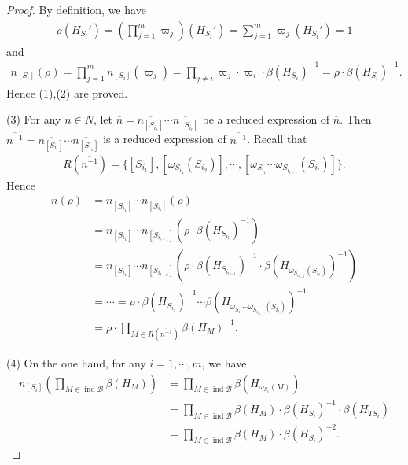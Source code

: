 \documentclass[12pt]{amsart}
\begin{document}
\begin{proof}
    By definition, we have
    \begin{align*}
         \rho(H_{S_i}') = (\prod_{j=1}^m \varpi_j)(H_{S_i}') = \sum_{j=1}^m \varpi_j (H_{S_i}') = 1
    \end{align*}
   and
    \begin{align*}
        n_{[S_i]}(\rho) = \prod_{j=1}^m n_{[S_i]}(\varpi_j) = \prod_{j\neq i} \varpi_j \cdot \varpi_i \cdot \beta(H_{S_i})^{-1} = \rho \cdot \beta(H_{S_i})^{-1}.
    \end{align*}
    Hence (1),(2) are proved.

    (3) For any $n\in N$, let $\overline{n} = \overline{n_{[S_{i_1}]}} \cdots \overline{n_{[S_{i_l}]}} $ be a reduced expression of $\overline{n}$.
    Then $\overline{n^{-1}} = \overline{n_{[S_{i_l}]}} \cdots \overline{n_{[S_{i_1}]}} $ is a reduced expression of $\overline{n^{-1}}$.
    Recall that 
    \begin{align*}
         R(\overline{n^{-1}}) = \{ [S_{i_1}], [\omega_{S_{i_1}}(S_{i_2})],\cdots,[\omega_{S_{i_1}}\cdots \omega_{S_{i_{l-1}}}(S_{i_l})]   \}.
    \end{align*}
    Hence 
    \begin{align*}
        n(\rho) &= n_{[S_{i_1}]} \cdots n_{[S_{i_l}]}(\rho) \\
            &= n_{[S_{i_1}]} \cdots n_{[S_{i_{l-1}}]}(\rho\cdot \beta(H_{S_{i_l}})^{-1}) \\
            &=  n_{[S_{i_1}]} \cdots n_{[S_{i_{l-2}}]}(\rho\cdot \beta(H_{S_{i_{l-1}}})^{-1} \cdot \beta(H_{\omega_{S_{i_{l-1}}}(S_{i_l})})^{-1}   ) \\
            &= \cdots =\rho \cdot \beta(H_{S_{i_1}})^{-1} \cdots \beta(H_{\omega_{S_{i_1}} \cdots \omega_{S_{i_{l-1}}} (S_{i_l}) })^{-1} \\
            &= \rho \cdot \prod_{M\in R(\overline{n^{-1}})} \beta(H_M)^{-1}.
    \end{align*}

    (4) On the one hand, for any $i=1,\cdots ,m$, we have 
    \begin{align*}
        n_{[S_i]}(\prod_{M\in \operatorname{ind}\mathcal{B}} \beta(H_M)) &= \prod_{M\in \operatorname{ind}\mathcal{B}} \beta(H_{\omega_{S_i}(M)}) \\
        &= \prod_{M\in \operatorname{ind}\mathcal{B}} \beta(H_M) \cdot \beta(H_{S_i})^{-1} \cdot \beta(H_{TS_i}) \\
        &= \prod_{M\in \operatorname{ind}\mathcal{B}} \beta(H_M) \cdot \beta(H_{S_i})^{-2}. 
    \end{align*}


\end{proof}
\end{document}
